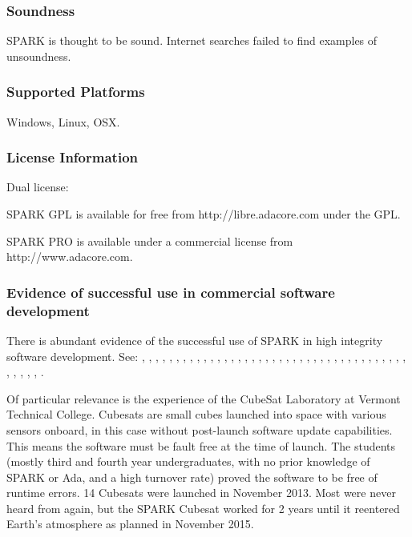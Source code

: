 \documentclass[12pt,openany,a4paper]{book}
\begin{document}
	\subsubsection{Soundness}
		SPARK is thought to be sound. Internet searches failed to find examples of unsoundness.

	\subsubsection{Supported Platforms}
		Windows, Linux, OSX.

	\subsubsection{License Information}
		Dual license:

		SPARK GPL is available for free from http://libre.adacore.com under the GPL.

		SPARK PRO is available under a commercial license from http://www.adacore.com.


	\subsubsection{Evidence of successful use in commercial software development}
	There is abundant evidence of the successful use of SPARK in high integrity software development. See: \cite{spark01}, \cite{spark02}, \cite{spark03}, \cite{spark04}, \cite{spark05}, \cite{spark06}, \cite{spark07}, \cite{spark08}, \cite{spark09}, \cite{spark10}, \cite{spark11}, \cite{spark12}, \cite{spark13}, \cite{spark14}, \cite{spark15}, \cite{spark16}, \cite{spark17}, \cite{spark18}, \cite{spark19}, \cite{spark20}, \cite{spark21}, \cite{spark22}, \cite{spark23}, \cite{spark24}, \cite{spark25}, \cite{spark26}, \cite{spark27}, \cite{spark28}, \cite{spark29}, \cite{spark30}, \cite{spark31}, \cite{spark32}, \cite{spark33}, \cite{spark34}, \cite{spark35}, \cite{spark36}, \cite{spark37}, \cite{spark38}, \cite{spark39}, \cite{spark40}, \cite{spark41}, \cite{spark42}, \cite{spark43}, \cite{spark44}, \cite{spark45}.
	
	
	Of particular relevance is the experience of the CubeSat Laboratory at Vermont Technical College\cite{sparkstudents}. Cubesats are small cubes launched into space with various sensors onboard, in this case without post-launch software update capabilities. This means the software must be fault free at the time of launch. The students (mostly third and fourth year undergraduates, with no prior knowledge of SPARK or Ada, and a high turnover rate) proved the software to be free of runtime errors. 14 Cubesats were launched in November 2013. Most were never heard from again, but the SPARK Cubesat worked for 2 years until it reentered Earth's atmosphere as planned in November 2015. 
\end{document}
